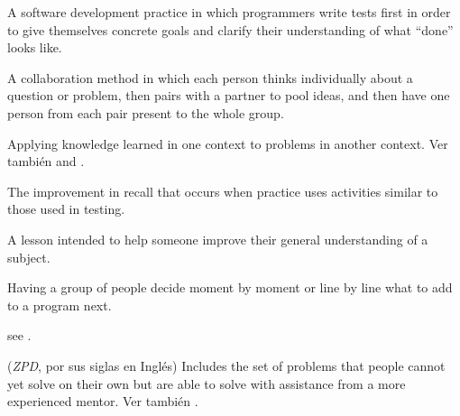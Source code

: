\begin{description}
 A software
development practice in which programmers write tests first in order to give
themselves concrete goals and clarify their understanding of what ``done'' looks
like.

 A collaboration method in which
each person thinks individually about a question or problem, then pairs with a
partner to pool ideas, and then have one person from each pair present to the
whole group.

 Applying knowledge learned
in one context to problems in another context.  Ver también
 and .

 The
improvement in recall that occurs when practice uses activities similar to those
used in testing.

 A lesson intended to help someone improve their
general understanding of a subject.

 Having a group of people decide moment
by moment or line by line what to add to a program next.

 see .

 (\emph{ZPD}, por sus siglas en Inglés) Includes the set of problems that
people cannot yet solve on their own but are able to solve with assistance from
a more experienced mentor.  Ver también .

\end{description}
